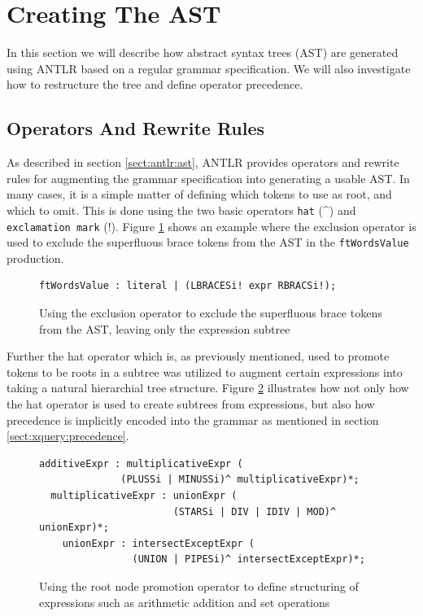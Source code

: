 \section{Creating The AST}
\label{sect:impl:ast}
In this section we will describe how abstract syntax trees (AST) are generated 
using ANTLR based on a regular grammar specification. We will also investigate
how to restructure the tree and define operator precedence.

\subsection{Operators And Rewrite Rules}
As described in section \ref{sect:antlr:ast}, ANTLR provides operators and
rewrite rules for augmenting the grammar specification into generating a usable
AST. In many cases, it is a simple matter of defining which tokens to use as
root, and which to omit. This is done using the two basic operators \verb!hat!
(\^{}) and \verb!exclamation mark! (!). Figure \ref{code:ast:exoperator} shows an
example where the exclusion operator is used to exclude the superfluous brace
tokens from the AST in the \verb!ftWordsValue! production.

\begin{figure}[h!]
\begin{Verbatim}
ftWordsValue : literal | (LBRACESi! expr RBRACSi!);
\end{Verbatim}
\caption[AST exclusion operator example]{Using the exclusion operator to exclude
the superfluous brace tokens from the AST, leaving only the expression subtree}
\label{code:ast:exoperator}
\end{figure}

Further the hat operator which is, as previously mentioned, used to promote
tokens to be roots in a subtree was utilized to augment certain expressions into
taking a natural hierarchial tree structure. Figure \ref{code:ast:hatoperator}
illustrates how not only how the hat operator is used to create subtrees from
expressions, but also how precedence is implicitly encoded into the grammar as
mentioned in section \ref{sect:xquery:precedence}.

\begin{figure}[h!]
\begin{Verbatim}
additiveExpr : multiplicativeExpr (
              (PLUSSi | MINUSSi)^ multiplicativeExpr)*;
  multiplicativeExpr : unionExpr (
                       (STARSi | DIV | IDIV | MOD)^ unionExpr)*;
    unionExpr : intersectExceptExpr (
                (UNION | PIPESi)^ intersectExceptExpr)*;
\end{Verbatim}
\caption[AST root node promotion operator example]{Using the root node promotion
operator to define structuring of expressions such as arithmetic addition and set
operations}
\label{code:ast:hatoperator}
\end{figure}

